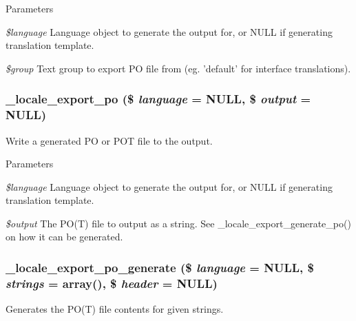 \begin{DoxyParams}{Parameters}
\item[{\em \$language}]Language object to generate the output for, or NULL if generating translation template. \item[{\em \$group}]Text group to export PO file from (eg. 'default' for interface translations). \end{DoxyParams}
\hypertarget{group__locale_gac152719d6aeadee6074247100424e145}{
\subsubsection[{\_\-locale\_\-export\_\-po}]{\setlength{\rightskip}{0pt plus 5cm}\_\-locale\_\-export\_\-po (\$ {\em language} = {\ttfamily NULL}, \/  \$ {\em output} = {\ttfamily NULL})}}
\label{group__locale_gac152719d6aeadee6074247100424e145}
Write a generated PO or POT file to the output.


\begin{DoxyParams}{Parameters}
\item[{\em \$language}]Language object to generate the output for, or NULL if generating translation template. \item[{\em \$output}]The PO(T) file to output as a string. See \_\-locale\_\-export\_\-generate\_\-po() on how it can be generated. \end{DoxyParams}
\hypertarget{group__locale_ga694b7e78936d2875e18ef4c8171b7eb8}{
\subsubsection[{\_\-locale\_\-export\_\-po\_\-generate}]{\setlength{\rightskip}{0pt plus 5cm}\_\-locale\_\-export\_\-po\_\-generate (\$ {\em language} = {\ttfamily NULL}, \/  \$ {\em strings} = {\ttfamily array()}, \/  \$ {\em header} = {\ttfamily NULL})}}
\label{group__locale_ga694b7e78936d2875e18ef4c8171b7eb8}
Generates the PO(T) file contents for given strings.


